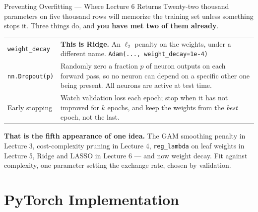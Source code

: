 \documentclass[aspectratio=169, 11pt]{beamer}
\begin{document}
\begin{frame}{Preventing Overfitting --- Where Lecture 6 Returns}
  Twenty-two thousand parameters on five thousand rows will memorize the training set unless
  something stops it. Three things do, and \textbf{you have met two of them already}.

  \vspace{0.1cm}
  \begin{center}
    {\small
    \begin{tabular}{p{3.0cm}p{9.4cm}}
      \toprule
      \texttt{weight\_decay} & \textbf{This is Ridge.} An $\ell_2$ penalty on the weights, under
      a different name. \texttt{Adam(..., weight\_decay=1e-4)} \\[3pt]
      \texttt{nn.Dropout(p)} & Randomly zero a fraction $p$ of neuron outputs on each forward
      pass, so no neuron can depend on a specific other one being present. All neurons are
      active at test time. \\[3pt]
      Early stopping & Watch validation loss each epoch; stop when it has not improved for
      $k$ epochs, and keep the weights from the \emph{best} epoch, not the last. \\
      \bottomrule
    \end{tabular}
    }
  \end{center}

  \vspace{0.1cm}
  \textbf{That is the fifth appearance of one idea.} The GAM smoothing penalty in Lecture 3,
  cost-complexity pruning in Lecture 4, \texttt{reg\_lambda} on leaf weights in Lecture 5,
  Ridge and LASSO in Lecture 6 --- and now weight decay. Fit against complexity, one parameter
  setting the exchange rate, chosen by validation.
\end{frame}

\section{PyTorch Implementation}

\end{document}

